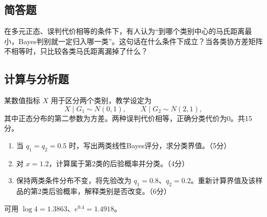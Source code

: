 \par\addvspace{6pt}\noindent\begin{minipage}{\linewidth}

\subsection{简答题}


在多元正态、误判代价相等的条件下，有人认为``到哪个类别中心的马氏距离最小，Bayes判别就一定归入哪一类''。这句话在什么条件下成立？当各类协方差矩阵不相等时，只比较各类马氏距离漏掉了什么？



\end{minipage}\par\vspace{4pt}

\par\addvspace{6pt}\noindent\begin{minipage}{\linewidth}

\subsection{计算与分析题}


某数值指标 \(X\) 用于区分两个类别，教学设定为 \[X\mid G_1\sim N(0,1),\qquad X\mid G_2\sim N(2,1),\] 其中正态分布的第二参数为方差。两种误判代价相等，正确分类代价为0。共15分。

\begin{enumerate}
\def\labelenumi{\arabic{enumi}.}
\tightlist
\item
  当 \(q_1=q_2=0.5\) 时，写出两类线性Bayes评分，求分类界值。（5分）
\item
  对 \(x=1.2\)，计算属于第2类的后验概率并分类。（4分）
\item
  保持两类条件分布不变，将先验改为 \(q_1=0.8\)、\(q_2=0.2\)。重新计算界值及该样品的第2类后验概率，解释类别是否改变。（6分）
\end{enumerate}

可用 \(\log4=1.3863\)、\(e^{0.4}=1.4918\)。



\end{minipage}\par\vspace{4pt}

